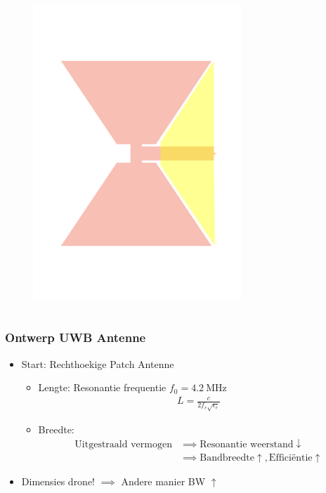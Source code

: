 \documentclass{beamer}
\begin{document}
\begin{frame}
\begin{columns}[c]
  \begin{column}{0.5\textwidth}
    \centering
    \begin{figure}[H]
    \includegraphics[width=0.7\textwidth]{images/bowtie.pdf}
    \end{figure}
  \end{column}
  \end{columns}
  \end{frame}

  \begin{frame}
  \frametitle{Ontwerp UWB Antenne}
  \begin{itemize}
    \item Start: Rechthoekige Patch Antenne
      \begin{itemize}
        \item Lengte: Resonantie frequentie $f_0 = \SI{4.2}{\mega\hertz}$
              \begin{align}  L = \frac{c}{2 f_r \sqrt{\epsilon_r}}  \nonumber \end{align}
        \item Breedte: \begin{align} \text{Uitgestraald vermogen} \nonumber & \implies \text{Resonantie weerstand} \downarrow \\ & \implies \text{Bandbreedte} \uparrow, \text{Effici\"entie} \uparrow \nonumber \end{align}

      \end{itemize}
    \item Dimensies drone! $\implies$ Andere manier BW $\uparrow$ 
    \end{itemize}
  \end{frame}
\end{document}
